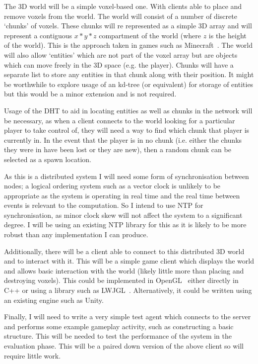 \documentclass[12pt,a4paper]{article}
\begin{document}
	The 3D world will be a simple voxel-based one. With clients able to place and remove voxels from the world. The world will consist of a number of discrete `chunks' of voxels. These chunks will re represented as a simple 3D array and will represent a contiguous $x*y*z$ compartment of the world (where $z$ is the height of the world). This is the approach taken in games such as Minecraft~\cite{mc}. The world will also allow `entities' which are not part of the voxel array but are objects which can move freely in the 3D space (e.g. the player). Chunks will have a separate list to store any entities in that chunk along with their position. It might be worthwhile to explore usage of an kd-tree (or equivalent) for storage of entities but this would be a minor extension and is not required.
	
	Usage of the DHT to aid in locating entities as well as chunks in the network will be necessary, as when a client connects to the world looking for a particular player to take control of, they will need a way to find which chunk that player is currently in. In the event that the player is in no chunk (i.e. either the chunks they were in have been lost or they are new), then a random chunk can be selected as a spawn location.
	
	As this is a distributed system I will need some form of synchronisation between nodes; a logical ordering system such as a vector clock is unlikely to be appropriate as the system is operating in real time and the real time between events is relevant to the computation. So I intend to use NTP for synchronisation, as minor clock skew will not affect the system to a significant degree. I will be using an existing NTP library for this as it is likely to be more robust than any implementation I can produce.
	
	Additionally, there will be a client able to connect to this distributed 3D world and to interact with it. This will be a simple game client which displays the world and allows basic interaction with the world (likely little more than placing and destroying voxels). This could be implemented in OpenGL~\cite{opengl} either directly in C++ or using a library such as LWJGL~\cite{lwjgl}. Alternatively, it could be written using an existing engine such as Unity.
	
	Finally, I will need to write a very simple test agent which connects to the server and performs some example gameplay activity, such as constructing a basic structure. This will be needed to test the performance of the system in the evaluation phase. This will be a paired down version of the above client so will require little work.
	
\end{document}
